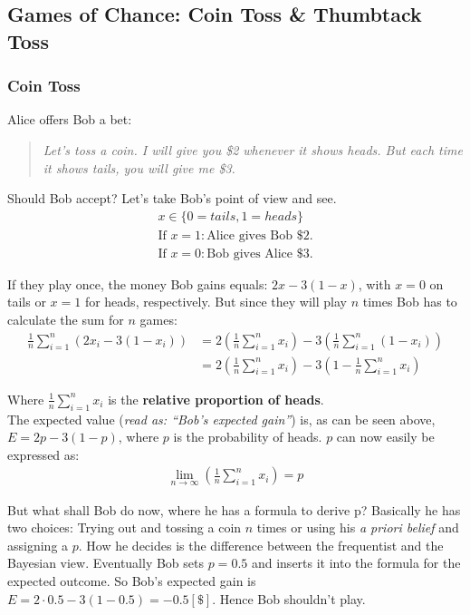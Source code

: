 \subsection{Games of Chance: Coin Toss \& Thumbtack Toss}

\subsubsection*{Coin Toss}

Alice offers Bob a bet: 

\begin{quote}
\textit{Let's toss a coin. I will give you  \$2  whenever it shows heads. But each time it shows tails, you will give me \$3.}
\end{quote}
Should Bob accept? Let's take Bob's point of view and see.
\begin{align*}
x \in \{0 = tails, 1 = heads\}\\
\mbox{If }x = 1: \mbox{Alice gives Bob \$2.}\\
\mbox{If }x = 0: \mbox{Bob gives Alice \$3.}
\end{align*}

If they play once, the money Bob gains equals: $2x - 3 (1 - x)$, with $x = 0$ on tails or $x = 1$ for heads, respectively.
But since they will play $n$ times Bob has to calculate the sum for $n$ games:
\begin{align*}
\frac{1}{n} \sum\limits_{i=1}^n \left(2x_i-3\left(1-x_i\right)\right) &= 2\left(\frac{1}{n}\sum\limits_{i=1}^n x_i\right)-3\left(\frac{1}{n}\sum\limits_{i=1}^n \left(1-x_i\right)\right)\\
&= 2\left(\frac{1}{n}\sum\limits_{i=1}^n x_i\right)-3\left(1-\frac{1}{n}\sum\limits_{i=1}^n x_i\right)
\end{align*}

Where $\frac{1}{n}\sum\limits_{i=1}^n x_i$ is the \textbf{relative proportion of heads}.\\
The expected value (\textit{read as: ``Bob's expected gain''}) is, as can be seen above, $E = 2p - 3 (1 - p)$, where $p$ is the probability of heads.
$p$ can now easily be expressed as:
\begin{align*}
\lim_{n\rightarrow\infty}\left(\frac{1}{n}\sum\limits_{i=1}^n x_i\right) = p
\end{align*}

But what shall Bob do now, where he has a formula to derive p? Basically he has two choices: Trying out and tossing a coin $n$ times or using his \textit{a priori belief} and assigning a $p$.
How he decides is the difference between the frequentist and the Bayesian view. 
Eventually Bob sets $p = 0.5$ and inserts it into the formula for the expected outcome.
So Bob's expected gain is $E = 2 \cdot 0.5 - 3 (1 - 0.5) = -0.5 \! \left[ \$ \right] $. Hence Bob shouldn't play.

